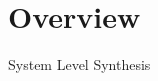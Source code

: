 \documentclass[11pt]{article}
\begin{document}
\setcounter{MaxMatrixCols}{20}
\setlength\parindent{0pt}

\section*{Overview}

System Level Synthesis 
\end{document}
